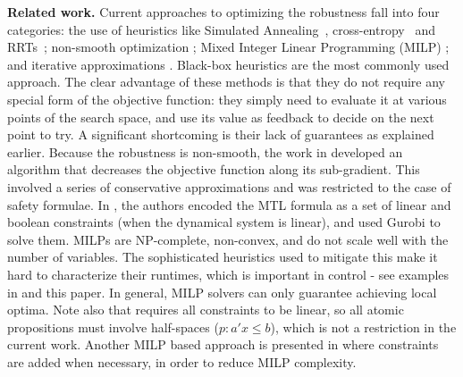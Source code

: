 \noindent \textbf{Related work.}
Current approaches to optimizing the robustness fall into four categories: 
the use of heuristics like Simulated Annealing~\cite{NghiemSFIGP10hscc}, cross-entropy~\cite{SankaranarayananF2012hscc} and RRTs~\cite{Dreossi15_RRTFalsification}; %
non-smooth optimization \cite{AbbasF13acc};  
Mixed Integer Linear Programming (MILP) \cite{Raman14_MPCSTL,Saha_acc16}; 
and iterative approximations \cite{AbbasATVA11_LinFalsification,Abbas14_MTLDescent,Deshmukh15_IterativeApproaches}.
Black-box heuristics%
are the most commonly used approach.
The clear advantage of these methods is that they do not require any special form of the objective function: they simply need to evaluate it at various points of the search space, and use its value as feedback to decide on the next point to try.
A significant shortcoming is their lack of guarantees as explained earlier.
Because the robustness is non-smooth, the work in \cite{AbbasF13acc} developed an algorithm that decreases the objective function along its sub-gradient. 
This involved a series of conservative approximations and was restricted to the case of safety formulae.
In \cite{Raman14_MPCSTL}, the authors encoded the MTL formula as a set of linear and boolean constraints (when the dynamical system is linear), and used Gurobi to solve them.
MILPs are NP-complete, non-convex, and do not scale well with the number of variables. 
The sophisticated heuristics used to mitigate this make it hard to characterize their runtimes, which is important in control - see examples in \cite{Raman14_MPCSTL} and this paper. 
In general, MILP solvers can only guarantee achieving local optima.
Note also that \cite{Raman14_MPCSTL} requires all constraints to be linear, so all atomic propositions must involve half-spaces ($p: a'x\leq b$), which is not a restriction in the current work. Another MILP based approach is presented in \cite{Saha_acc16} where constraints are added when necessary, in order to reduce MILP complexity.
